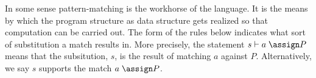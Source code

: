 








In some sense pattern-matching is the workhorse of the language. It is
the means by which the program structure as data structure gets
realized so that computation can be carried out. The form of the rules
below indicates what sort of substitution a match results in. More
precisely, the statement $ s \vdash a \; \assign P $ means that the
subsitution, $s$, is the result of matching $a$ against
$P$. Alternatively, we say $s$ supports the match $a \; \assign P$.

